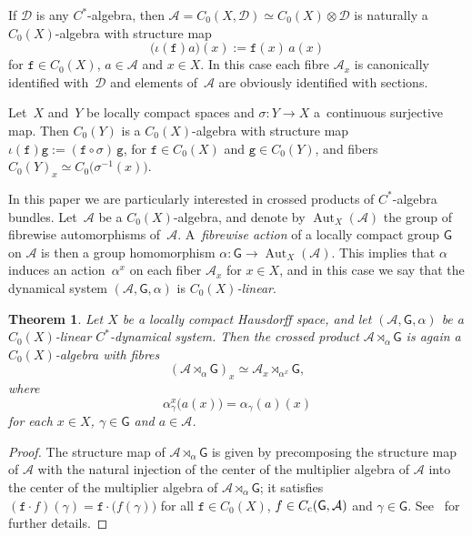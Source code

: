 \documentclass[10pt,a4paper]{amsart}
\numberwithin{equation}{section}
\newcommand{\Dcal}{\mathcal{D}}
\newcommand{\sfG}{\mathsf{G}}
\newcommand{\Aut}{\operatorname{Aut}}
\def\alg{{\mathcal A}}
\newtheorem{Theorem}{Theorem}[section]
\begin{document}
\begin{Example}
If $\Dcal$ is any $C^*$-algebra, then $\alg=C_0(X,\Dcal)\simeq
C_0(X)\otimes\Dcal$ is naturally a $C_0(X)$-algebra with structure map
\[
\big(\iota(\mathtt{f})a\big)(x) := \mathtt{f}(x)\,a(x)
\]
for $\mathtt{f}\in C_0(X)$, $a\in\alg$ and $x\in X$. In this case each fibre
$\alg_x$ is canonically identified with~$\Dcal$ and elements of~$\alg$
are obviously identified with sections.
\end{Example}

\begin{Example}\label{ex:ctsmaps}
Let~$X$ and~$Y$ be locally compact spaces and $\sigma\colon Y\to X$ a~continuous surjective map. Then $C_0(Y)$ is a $C_0(X)$-algebra with structure map
$\iota(\mathtt{f})\mathtt{g}:=(\mathtt{f}\circ\sigma)\,\mathtt{g}$, for $\mathtt{f}\in C_0(X)$ and $\mathtt{g}\in C_0(Y)$,
and fibers $C_0(Y)_x\simeq C_0\big(\sigma^{-1}(x)\big)$.
\end{Example}

In this paper we are particularly interested in crossed
products of $C^*$-algebra bundles. Let~$\alg$ be a $C_0(X)$-algebra,
and denote by $\Aut_X(\alg)$ the group of {fibrewise
automorphisms} of~$\alg$. A~\emph{fibrewise action} of a locally compact group $\sfG$ on
$\alg$ is then a group homomorphism $\alpha\colon \sfG\to\Aut_X(\alg)$. This
implies that $\alpha$ induces an action~$\alpha^x$ on each fiber
$\alg_x$ for $x\in X$, and in
this case we say that the dynamical system $(\alg,\sfG,\alpha)$ is
\emph{$C_0(X)$-linear}.

\begin{Theorem}\label{thm:crossedfibres}
Let $X$ be a locally compact Hausdorff space, and let
$(\alg,\sfG,\alpha)$ be a $C_0(X)$-linear $C^*$-dynamical system. Then
the crossed product $\alg\rtimes_\alpha\sfG$ is again a
$C_0(X)$-algebra with fibres
\[
(\alg\rtimes_\alpha\sfG)_x\simeq\alg_x\rtimes_{\alpha^x}\sfG ,
\]
where
\[
\alpha_\gamma^x\big(a(x)\big) = \alpha_\gamma(a)(x)
\]
for each $x\in X$, $\gamma\in\sfG$ and $a\in\alg$.
\end{Theorem}

\begin{proof}The structure map
of $\alg\rtimes_\alpha\sfG$ is given by precomposing the structure map
of $\alg$ with the natural injection of the center of the multiplier
algebra of $\alg$ into the center of the multiplier algebra of
$\alg\rtimes_\alpha\sfG$; it satisfies
$(\mathtt{f}\cdot f)(\gamma)=\mathtt{f}\cdot\big(f(\gamma)\big)$ for all
$\mathtt{f}\in C_0(X)$, $f\in C_{\rm c}(\sfG,\alg)$ and
$\gamma\in\sfG$. See~\cite[Theorem~8.4]{Williams2007} for further
details.
\end{proof}
\end{document}
